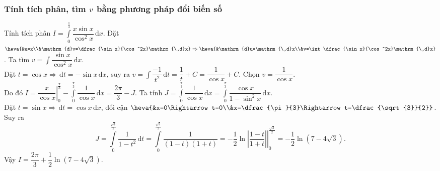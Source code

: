 \subsubsection{Tính tích phân, tìm $\lowercase{v}$ bằng phương pháp đổi biến số}
\begin{ex}%
	Tính tích phân $\displaystyle I=\int\limits_{0}^{\frac{\pi}{3}}\dfrac{x\sin x}{\cos^2x}\mathrm{\,d}x$.
	\loigiai
	{
		Đặt $\displaystyle \heva{&u=x\\&\mathrm{d}v=\dfrac{\sin x}{\cos^2x}\mathrm{\,d}x}\Rightarrow\heva{&\mathrm{d}u=\mathrm{\,d}x\\&v=\int\dfrac{\sin x}{\cos^2x}\mathrm{\,d}x}$. Ta tìm $\displaystyle v=\int\dfrac{\sin x}{\cos^2x}\mathrm{\,d}x$.\\
		Đặt $t=\cos x\Rightarrow \mathrm{\,d}t=-\sin x\mathrm{\,d}x$, suy ra $\displaystyle v=\int\dfrac{-1}{t^2}\mathrm{\,d}t=\dfrac{1}{t}+C=\dfrac{1}{\cos x}+C$. Chọn $v=\dfrac{1}{\cos x}$.\\
		Do đó $\displaystyle I=\left.\dfrac{x}{\cos x}\right|_{0}^{\frac{\pi}{3}}-\int\limits_0^{\frac{\pi}{3}}\dfrac{1}{\cos x}\mathrm{\,d}x=\dfrac{2\pi}{3}-J$. Ta tính $\displaystyle J=\int\limits_0^{\frac{\pi}{3}}\dfrac{1}{\cos x}\mathrm{\,d}x=\int\limits_0^{\frac{\pi}{3}}\dfrac{\cos x}{1-\sin^2 x}\mathrm{\,d}x$.\\
		Đặt $t=\sin x\Rightarrow \mathrm{\,d}t=\cos x\mathrm{\,d}x$, đổi cận $\heva{&x=0\Rightarrow t=0\\&x=\dfrac{\pi}{3}\Rightarrow t=\dfrac{\sqrt{3}}{2}}$. Suy ra
		\[J=\int\limits_0^{\frac{\sqrt{3}}{2}}\dfrac{1}{1-t^2}\mathrm{\,d}t=\int\limits_0^{\frac{\sqrt{3}}{2}}\dfrac{1}{(1-t)(1+t)}=-\dfrac{1}{2}\left.\ln\left|\dfrac{1-t}{1+t}\right|\right|_0^{\frac{\sqrt{3}}{2}}=-\dfrac{1}{2}\ln(7-4\sqrt{3}).\]
		Vậy $I=\dfrac{2\pi}{3}+\dfrac{1}{2}\ln(7-4\sqrt{3})$.
	}
\end{ex}
